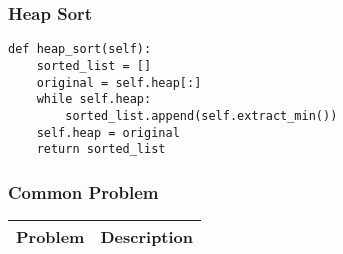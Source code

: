 \subsubsection{Heap Sort}
\begin{algo}
\begin{lstlisting}
def heap_sort(self):
    sorted_list = []
    original = self.heap[:]
    while self.heap:
        sorted_list.append(self.extract_min())
    self.heap = original
    return sorted_list
\end{lstlisting}
\end{algo}
\newpage

\subsubsection{Common Problem}
\begin{summary}
    \begin{center}
        \begin{tabular}{ll}
            \toprule
            \textbf{Problem} & \textbf{Description} \\
            \midrule

\end{tabular}
\end{center}
\end{summary}
